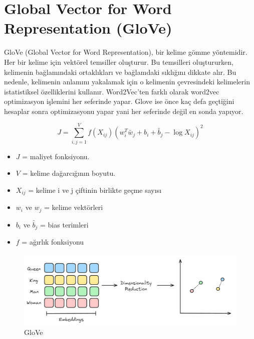 \section{Global Vector for Word Representation (GloVe)}
GloVe (Global Vector for Word Representation), bir kelime gömme yöntemidir.  Her bir kelime için vektörel temsiller oluşturur. Bu temsilleri oluştururken, kelimenin bağlamındaki ortaklıkları ve bağlamdaki sıklığını dikkate alır. Bu nedenle, kelimenin anlamını yakalamak için o kelimenin çevresindeki kelimelerin istatistiksel özelliklerini kullanır. Word2Vec'ten farklı olarak word2vec optimizasyon işlemini her seferinde yapar. Glove ise önce kaç defa geçtiğini hesaplar sonra optimizasyonu yapar yani her seferinde değil en sonda yapıyor.

\[J = \sum_{i,j=1}^{V} f(X_{ij}) \left( w_{i}^{T} \tilde{w_{j}} + b_{i} + \tilde{b_{j}} - \log X_{ij} \right)^2\]

\begin{itemize}
    \item $J$ = maliyet fonksiyonu.
    \item $V$ = kelime dağarcığının boyutu.
    \item $X_{ij}$ = kelime i ve j çiftinin birlikte geçme sayısı
    \item $w_{i}$ ve $w_{j}$ = kelime vektörleri
    \item $b_{i}$ ve $\tilde{b_{j}}$ = bias terimleri
    \item $f$ = ağırlık fonksiyonu
\end{itemize}

\begin{figure}[h]
    \centering
    \includegraphics[width=1\textwidth]{images/glove.png}
    \caption{GloVe}
    \label{fig:enter-label}
\end{figure}

\newpage